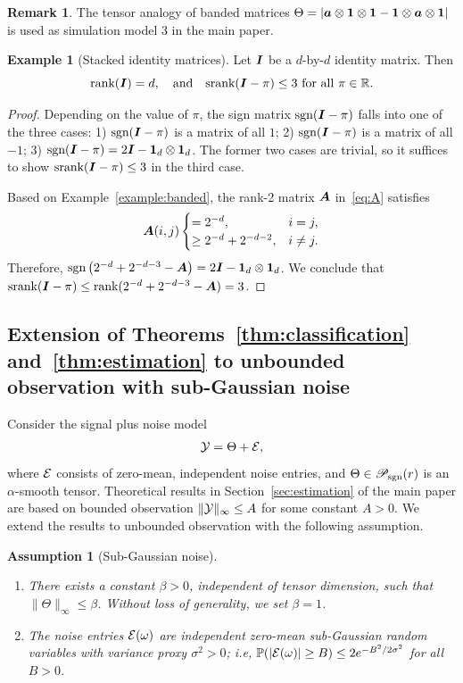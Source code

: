 \documentclass[11pt]{article}
\theoremstyle{plain}
\newtheorem{assumption}{Assumption}[section]
\theoremstyle{definition}
\newtheorem{example}{Example}[section]
\newtheorem{rmk}{Remark}[section]
\def\sign{\textup{sgn}}
\def\srank{\textup{srank}}
\def\rank{\textup{rank}}
\def\caliP{\mathscr{P}_{\textup{sgn}}}
\begin{document}
\begin{rmk} The tensor analogy of banded matrices $\Theta=|\bm{a}\otimes\mathbf{1}\otimes \mathbf{1}-\mathbf{1}\otimes\bm{a}\otimes \mathbf{1}|$ is used as simulation model 3 in the main paper.  
\end{rmk}

\begin{example}[Stacked identity matrices]
Let $\bm I$ be a $d$-by-$d$ identity matrix. Then
\[
\rank(\mI)=d,\quad\text{and}\quad  \srank(\mI-\pi)\leq 3 \ \text{for all }\pi\in\mathbb{R}.
\]
\end{example}
\begin{proof}
Depending on the value of $\pi$, the sign matrix $\sign(\mI-\pi)$ falls into one of the three cases: 1) $\sign(\mI-\pi)$ is a matrix of all $1$; 2) $\sign(\mI-\pi)$ is a matrix of all $-1$; 3) $\sign(\mI-\pi)=2\mI-\mathbf{1}_d\otimes \mathbf{1}_d$. The former two cases are trivial, so it suffices to show $\srank(\mI-\pi)\leq 3$ in the third case.   


Based on Example~\ref{example:banded}, the rank-2 matrix $\bm A$ in~\eqref{eq:A} satisfies 
\[
\bm A(i,j)
\begin{cases}
=2^{-d}, & i=j,\\
\geq 2^{-d}+2^{-d-2}, & i\neq j.
\end{cases}
\]
Therefore, $\sign\left(2^{-d}+2^{-d-3}-\mA\right)=2\mI-\mathbf{1}_d\otimes \mathbf{1}_d$. We conclude that $\srank(\mI-\pi)\leq \rank(2^{-d}+2^{-d-3}-\mA)=3$. 
\end{proof}
\subsection{Extension of Theorems~\ref{thm:classification} and~\ref{thm:estimation} to unbounded observation with sub-Gaussian noise}\label{sec:subGaussian}
Consider the signal plus noise model
\begin{align*}
\mathcal{Y} = \Theta+\mathcal{E},
\end{align*}
where $\mathcal{E}$ consists of zero-mean, independent noise entries, and $\Theta\in\caliP(r)$ is an $\alpha$-smooth tensor.
Theoretical results in Section~\ref{sec:estimation} of the main paper are based on bounded observation $\|\mathcal{Y}\|_\infty\leq A$ for some constant $A>0$. We extend the results to unbounded observation with the following assumption.
\begin{assumption}[Sub-Gaussian noise]\label{assm:subg}\text{ }
\begin{enumerate}
\item There exists a constant $\beta>0$, independent of tensor dimension, such that $\|\Theta\|_\infty\leq \beta$. Without loss of generality, we set $\beta = 1$.
\item The noise entries $\mathcal{E}(\omega)$ are independent zero-mean sub-Gaussian random variables with variance proxy $\sigma^2>0$; i.e, $\mathbb{P}(|\mathcal{E}(\omega)|\geq B)\leq 2e^{-B^2/2\sigma^2}$ for all $B>0$.  
\end{enumerate}
\end{assumption}
\end{document}
